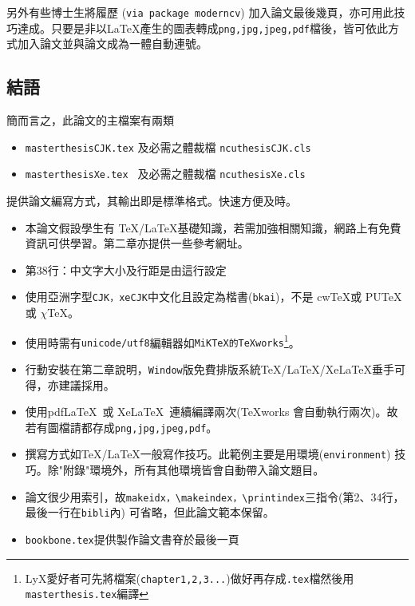 另外有些博士生將履歷 ({\tt via package moderncv}) 加入論文最後幾頁，亦可用此技巧達成。只要是非以\LaTeX{}產生的圖表轉成{\tt png,jpg,jpeg,pdf}檔後，皆可依此方式加入論文並與論文成為一體自動連號。


\subsection{結語}
簡而言之，此論文的主檔案有兩類
\begin{itemize}
\item {\tt masterthesisCJK.tex} 及必需之體裁檔 {\tt ncuthesisCJK.cls}
\item {\tt masterthesisXe.tex } 及必需之體裁檔 {\tt ncuthesisXe.cls}
\end{itemize}
提供論文編寫方式，其輸出即是標準格式。快速方便及時。
\begin{itemize} \index{\TeX!\LaTeX}
\item 本論文假設學生有 \TeX/\LaTeX 基礎知識，若需加強相關知識，網路上有免費資訊可供學習。第二章亦提供一些參考網址。 
\item 第38行：中文字大小及行距是由這行設定
\item 使用亞洲字型{\tt CJK，xeCJK}中文化且設定為楷書({\tt bkai})，不是 cw\TeX 或 PU\TeX 或 $\chi$\TeX。 
\item 使用時需有{\tt unicode/utf8}編輯器如{\tt MiKTeX的TeXworks}\footnote{LyX愛好者可先將檔案({\tt chapter1,2,3...})做好再存成{\tt .tex}檔然後用{\tt masterthesis.tex}編譯}。  
\item {\color{red}行動安裝}在第二章說明，{\tt Window}版免費排版系統\TeX{}/\LaTeX{}/Xe\LaTeX 垂手可得，亦建議採用。 
\item 使用pdf\LaTeX\ 或 Xe\LaTeX\ 連續編譯兩次(TeXworks 會自動執行兩次)。故若有圖檔請都存成{\tt png,jpg,jpeg,pdf}。
\item 撰寫方式如\TeX/\LaTeX{}一般寫作技巧。此範例主要是用環境\linebreak({\tt environment}) 技巧。除"附錄"環境外，所有其他環境皆會自動帶入論文題目。
\item 論文很少用索引，故{\tt makeidx，\textbackslash makeindex，\textbackslash printindex}三指令(第2、34行，最後一行在{\tt bibli}內) 可省略，但此論文範本保留。
\item {\tt bookbone.tex}提供製作論文書脊於最後一頁%

\end{itemize}
